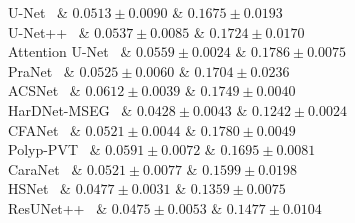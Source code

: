 U-Net~\cite{ronneberger2015unet}
& $0.0513 \pm 0.0090$
& $0.1675 \pm 0.0193$ \\

U-Net++~\cite{zhou2018unetpp}
& $0.0537 \pm 0.0085$
& $0.1724 \pm 0.0170$ \\

Attention U-Net~\cite{oktay2018attentionunet}
& $0.0559 \pm 0.0024$
& $0.1786 \pm 0.0075$ \\

PraNet~\cite{fan2020pranet}
& $0.0525 \pm 0.0060$
& $0.1704 \pm 0.0236$ \\

ACSNet~\cite{zhang2020acsnet}
& $0.0612 \pm 0.0039$
& $0.1749 \pm 0.0040$ \\

HarDNet-MSEG~\cite{huang2021hardnetmseg}
& $0.0428 \pm 0.0043$
& $0.1242 \pm 0.0024$ \\

CFANet~\cite{zhou2023cfanet}
& $0.0521 \pm 0.0044$
& $0.1780 \pm 0.0049$ \\

Polyp-PVT~\cite{dong2023polyppvt}
& $0.0591 \pm 0.0072$
& $0.1695 \pm 0.0081$ \\

CaraNet~\cite{lou2023caranet}
& $0.0521 \pm 0.0077$
& $0.1599 \pm 0.0198$ \\

HSNet~\cite{zhang2022hsnet}
& $0.0477 \pm 0.0031$
& $0.1359 \pm 0.0075$ \\

ResUNet++~\cite{jha2021resunetpp}
& $0.0475 \pm 0.0053$
& $0.1477 \pm 0.0104$ \\
